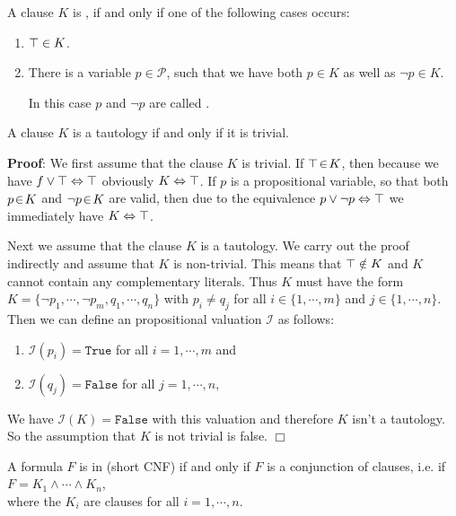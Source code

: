 \begin{Definition}
  A clause $K$ is , if and only if one of the following cases occurs:
  \begin{enumerate}
  \item $\top \in K$.
  \item There is a variable  $p \in \mathcal{P}$, such that we have both $p \in K$ as well as $\neg p \in K$.

        In this case $p$ and $\neg p$ are called  .
        \eox
\end{enumerate}
\end{Definition}

\begin{Proposition} \label{satz:trivial}
  A clause $K$ is a tautology if and only if it is trivial.
\end{Proposition}
\textbf{Proof}:  We first assume that the clause $K$ is trivial.
If $\top \!\in\! K$, then because we have
$f \vee \top \Leftrightarrow \top$
obviously $K \Leftrightarrow \top$.   If $p$ is a propositional variable, so that
both $p \!\in\! K$ and $\neg p \!\in\! K$ are valid, then due to the equivalence $p \vee
\neg p \Leftrightarrow \top$ we immediately have $K \Leftrightarrow \top$.

Next we assume that the clause $K$ is a tautology.  We carry out the proof
indirectly and assume that $K$ is non-trivial.  This means that $\top \notin K$ and
$K$ cannot contain any complementary literals.  Thus $K$ must have the form
\\[0.2cm]
\hspace*{1.3cm} 
$K = \{ \neg p_1, \cdots, \neg p_m, q_1, \cdots, q_n \}$ \quad with $p_i
\not= q_j$ for all $i \in \{ 1,\cdots,m\}$ and $j \in \{1, \cdots, n\}$.
\\[0.2cm]
Then we can define an propositional valuation $\mathcal{I}$ as follows:
\begin{enumerate}
\item $\mathcal{I}(p_i) = \texttt{True}$ for all $i = 1, \cdots, m$ and
\item $\mathcal{I}(q_j) = \texttt{False}$ for all $j = 1, \cdots, n$,
\end{enumerate}
We have $\mathcal{I}(K) = \texttt{False}$ with this valuation and therefore $K$ isn't a tautology.  So the
assumption that $K$ is not trivial is false. 
\hspace*{\fill}  $\Box$

\begin{Definition}  
  A formula $F$ is in  (short CNF)
  if and only if $F$ is a conjunction of clauses, i.e. if \\[0.2cm]
  \hspace*{1.3cm} $F = K_1 \wedge \cdots \wedge K_n$, \\[0.2cm]
  where the $K_i$ are clauses for all $i=1,\cdots,n$. \eox
\end{Definition}

